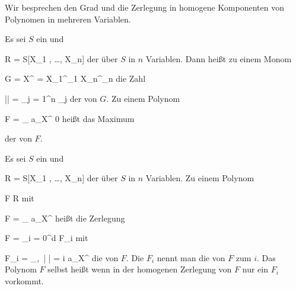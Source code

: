 \setcounter{section}{5}









Wir besprechen den Grad und die Zerlegung in homogene Komponenten von Polynomen in mehreren Variablen.


{}
{





Es sei $S$ ein
und

\mavergleichskette
{\vergleichskette
{R
}
{ = }{ S[X_1 , \ldots ,  X_n]
}
{  }{
}
{    }{
}
{   }{
}
}
{}{}{}
der
über $S$ in $n$ Variablen. Dann heißt zu einem Monom

\mavergleichskettedisp
{\vergleichskette
{ G
}
{ =} { X^\nu
}
{ =} { X_1^{\nu_1 } \cdots X_n^{\nu_n }
}
{ } {
}
{ } {
}
}
{}{}{}
die Zahl

\mavergleichskettedisp
{\vergleichskette
{ |\nu |
}
{ =} { \sum_{j = 1}^n \nu_j
}
{ } {
}
{ } {
}
{ } {
}
}
{}{}{}
der  von $G$. Zu einem Polynom

\mavergleichskette
{\vergleichskette
{F
}
{ = }{ \sum_{\nu} a_\nu X^\nu
}
{ \neq }{ 0
}
{    }{
}
{   }{
}
}
{}{}{}
heißt das Maximum

 {  }

der  von $F$.





}


{}
{





Es sei $S$ ein
und

\mavergleichskette
{\vergleichskette
{R
}
{ = }{ S[X_1 , \ldots ,  X_n]
}
{  }{
}
{    }{
}
{   }{
}
}
{}{}{}
der
über $S$ in $n$ Variablen. Zu einem Polynom

\mavergleichskette
{\vergleichskette
{F
}
{ \in }{ R
}
{  }{
}
{    }{
}
{   }{
}
}
{}{}{}
mit

\mavergleichskette
{\vergleichskette
{ F
}
{ = }{ \sum_{\nu} a_\nu X^\nu
}
{  }{
}
{    }{
}
{   }{
}
}
{}{}{}
heißt die Zerlegung

\mavergleichskettedisp
{\vergleichskette
{ F
}
{ =} { \sum_{i = 0}^d F_i
}
{ } {
}
{ } {
}
{ } {
}
}
{}{}{}
mit

\mavergleichskettedisp
{\vergleichskette
{ F_i
}
{ =} { \sum_{\nu,\, | \nu | =  i} a_\nu X^\nu
}
{ } {
}
{ } {
}
{ } {
}
}
{}{}{}
die  von $F$. Die $F_i$ nennt man die  von $F$ zum
$i$. Das Polynom $F$ selbst heißt  wenn in der homogenen Zerlegung von $F$ nur ein $F_i$ vorkommt.





}


